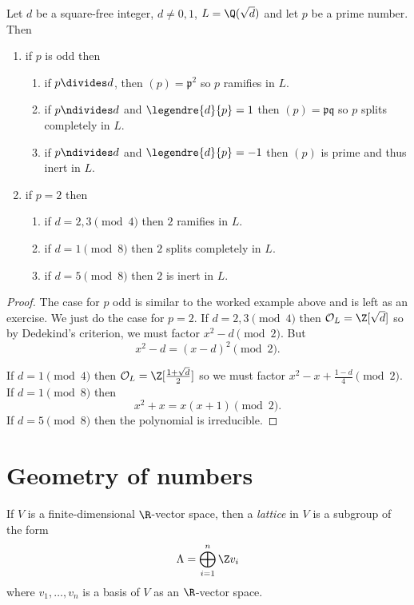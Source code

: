 \documentclass[a4paper]{article}
\renewcommand*{\O}{\mathcal{O}}
\begin{document}
\begin{proposition}
  Let \(d\) be a square-free integer, \(d \neq 0, 1\), \(L = \Q(\sqrt d)\) and let \(p\) be a prime number. Then
  \begin{enumerate}
  \item if \(p\) is odd then
    \begin{enumerate}
    \item if \(p \divides d\), then \((p) = \mathfrak p^2\) so \(p\) ramifies in \(L\).
    \item if \(p \ndivides d\) and \(\legendre{d}{p} = 1\) then \((p) = \mathfrak p \mathfrak q\) so \(p\) splits completely in \(L\).
    \item if \(p \ndivides d\) and \(\legendre{d}{p} = -1\) then \((p)\) is prime and thus inert in \(L\).
    \end{enumerate}
  \item if \(p = 2\) then
    \begin{enumerate}
    \item if \(d = 2, 3 \pmod 4\) then \(2\) ramifies in \(L\).
    \item if \(d = 1 \pmod 8\) then \(2\) splits completely in \(L\).
    \item if \(d = 5 \pmod 8\) then \(2\) is inert in \(L\).
    \end{enumerate}
  \end{enumerate}
\end{proposition}

\begin{proof}
  The case for \(p\) odd is similar to the worked example above and is left as an exercise. We just do the case for \(p = 2\). If \(d = 2, 3 \pmod 4\) then \(\O_L = \Z[\sqrt d]\) so by Dedekind's criterion, we must factor \(x^2 - d \pmod 2\). But
  \[
    x^2 - d = (x - d)^2 \pmod 2.
  \]

  If \(d = 1 \pmod 4\) then \(\O_L = \Z[\frac{1 + \sqrt d}{2}]\) so we must factor \(x^2 - x + \frac{1 - d}{4} \pmod 2\). If \(d = 1 \pmod 8\) then
  \[
    x^2 + x = x(x + 1) \pmod 2.
  \]
  If \(d = 5 \pmod 8\) then the polynomial is irreducible.
\end{proof}

\section{Geometry of numbers}

\begin{definition}[Lattice]
  If \(V\) is a finite-dimensional \(\R\)-vector space, then a \emph{lattice} in \(V\) is a subgroup of the form
  \[
    \Lambda = \bigoplus_{i = 1}^n \Z v_i
  \]
  where \(v_1, \dots, v_n\) is a basis of \(V\) as an \(\R\)-vector space.
\end{definition}
\end{document}
